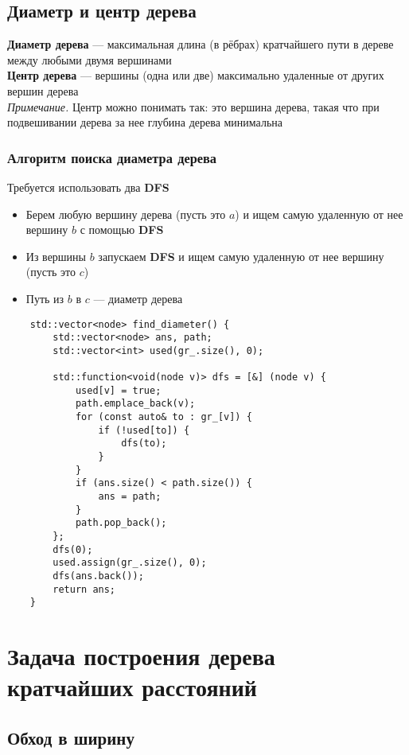 \documentclass[a4paper]{article}
\newcommand{\dfs}{\textbf{DFS }}
\begin{document}
\subsection{Диаметр и центр дерева}
\textbf{Диаметр дерева} — максимальная длина (в рёбрах) кратчайшего пути в дереве между любыми двумя вершинами\\[2mm]
\indent\textbf{Центр дерева} — вершины (одна или две) максимально удаленные от других вершин дерева\\
\indent\indent\textit{Примечание.} Центр можно понимать так: это вершина дерева, такая что при подвешивании дерева за нее глубина дерева минимальна
\subsubsection*{Алгоритм поиска диаметра дерева}
Требуется использовать два \dfs
\begin{itemize}
    \item Берем любую вершину дерева (пусть это $a$) и ищем самую удаленную от нее вершину $b$ с помощью \dfs
    \item Из вершины $b$ запускаем \dfs и ищем самую удаленную от нее вершину (пусть это $c$)
    \item Путь из $b$ в $c$ — диаметр дерева
\end{itemize}

\begin{lstlisting}
    std::vector<node> find_diameter() {
        std::vector<node> ans, path;
        std::vector<int> used(gr_.size(), 0);

        std::function<void(node v)> dfs = [&] (node v) {
            used[v] = true;
            path.emplace_back(v);
            for (const auto& to : gr_[v]) {
                if (!used[to]) {
                    dfs(to);
                }
            }
            if (ans.size() < path.size()) {
                ans = path;
            }
            path.pop_back();
        };
        dfs(0);
        used.assign(gr_.size(), 0);
        dfs(ans.back());
        return ans;
    }
\end{lstlisting}

\section{Задача построения дерева кратчайших расстояний}
\subsection{Обход в ширину}
\end{document}
